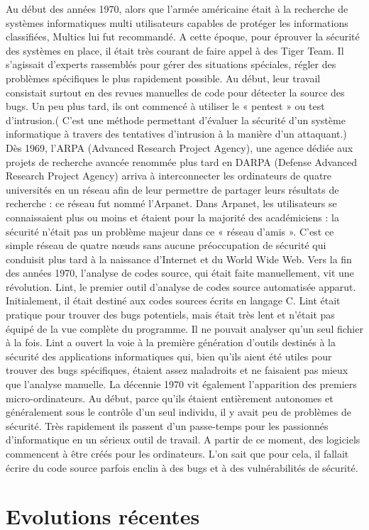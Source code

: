Au début des années 1970, alors que l’armée américaine était à la recherche de systèmes informatiques multi utilisateurs capables de protéger les informations classifiées, Multics lui fut recommandé. 
A cette époque, pour éprouver la sécurité des systèmes en place, il était très courant de faire appel à des Tiger Team. Il s’agissait d’experts rassemblés pour gérer des situations spéciales, régler des problèmes spécifiques le plus rapidement possible. Au début, leur travail consistait surtout en des revues manuelles de code pour détecter la source des bugs. Un peu plus tard, ils ont commencé à utiliser le «  pentest » ou test d’intrusion.( C’est une méthode permettant d’évaluer la sécurité d’un système informatique à travers des tentatives d’intrusion à la manière d’un attaquant.)
Dès 1969, l’ARPA (Advanced Research Project Agency), une agence dédiée aux projets de recherche avancée renommée plus tard en DARPA (Defense Advanced Research Project Agency) arriva à interconnecter les ordinateurs de quatre universités en un réseau afin de leur permettre de partager leurs résultats de recherche : ce réseau fut nommé l’Arpanet. Dans Arpanet, les utilisateurs se connaissaient plus ou moins et étaient pour la majorité des académiciens : la sécurité n’était pas un problème majeur dans ce « réseau d’amis ». C’est ce simple réseau de quatre nœuds sans aucune préoccupation de sécurité qui conduisit plus tard à la naissance d’Internet et du World Wide Web. 
Vers la fin des années 1970, l’analyse de codes source, qui était faite manuellement, vit une révolution. Lint, le premier outil d’analyse de codes source automatisée apparut. Initialement, il était destiné aux codes sources écrits en langage C. Lint était pratique pour trouver des bugs potentiels, mais était très lent et n'était pas équipé de la vue complète du programme. Il ne pouvait analyser qu'un seul fichier à la fois. Lint a ouvert la voie à la première génération d’outils destinés à la sécurité des applications informatiques qui, bien qu'ils aient été utiles pour trouver des bugs spécifiques, étaient assez maladroits et ne faisaient pas mieux que l'analyse manuelle.
La décennie 1970 vit également l’apparition des premiers micro-ordinateurs. Au début, parce qu’ils étaient entièrement autonomes et généralement sous le contrôle d'un seul individu, il y avait peu de problèmes de sécurité. Très rapidement ils passent d'un passe-temps pour les passionnés d'informatique en un sérieux outil de travail. A partir de ce moment, des logiciels commencent à être créés pour les ordinateurs. L’on sait que pour cela, il fallait écrire du code source parfois enclin à des bugs et à des vulnérabilités de sécurité.


\section{Evolutions récentes}




\clearpage 
